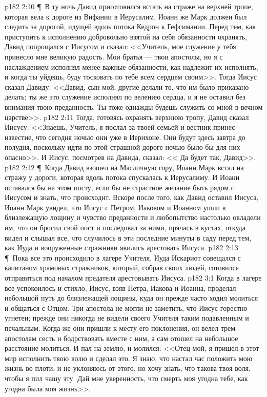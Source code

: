 \vs p182 2:10 \P\ В ту ночь Давид приготовился встать на страже на верхней тропе, которая вела к дороге из Вифании в Иерусалим, Иоанн же Марк должен был следить за дорогой, идущей вдоль потока Кедрон к Гефсимании. Перед тем, как приступить к исполнению добровольно взятой на себя обязанности охранять, Давид попрощался с Иисусом и сказал: <<Учитель, мое служение у тебя принесло мне великую радость. Мои братья --- твои апостолы, но я с наслаждением исполнял менее важные обязанности, как надлежит их исполнять, и когда ты уйдешь, буду тосковать по тебе всем сердцем своим>>. Тогда Иисус сказал Давиду: <<Давид, сын мой, другие делали то, что им было приказано делать; ты же это служение исполнял по велению сердца, и я не оставил без внимания твою преданность. Ты тоже однажды будешь служить со мной в вечном царстве>>.
\vs p182 2:11 Тогда, готовясь охранять верхнюю тропу, Давид сказал Иисусу: <<Знаешь, Учитель, я послал за твоей семьей и вестник принес известие, что сегодня ночью они уже в Иерихоне. Они будут здесь завтра до полудня, поскольку идти по этой страшной дороге ночью было бы для них опасно>>. И Иисус, посмотрев на Давида, сказал: << Да будет так, Давид>>.
\vs p182 2:12 \P\ Когда Давид взошел на Масличную гору, Иоанн Марк встал на стражу у дороги, которая вдоль потока спускалась к Иерусалиму. И Иоанн оставался бы на этом посту, если бы не страстное желание быть рядом с Иисусом и знать, что происходит. Вскоре после того, как Давид оставил Иисуса, Иоанн Марк увидел, что Иисус с Петром, Иаковом и Иоанном ушли в близлежащую лощину и чувство преданности и любопытство настолько овладели им, что он бросил свой пост и последовал за ними, прячась в кустах, откуда видел и слышал все, что случилось в эти последние минуты в саду перед тем, как Иуда и вооруженные стражники явились арестовать Иисуса.
\vs p182 2:13 \P\ Пока все это происходило в лагере Учителя, Иуда Искариот совещался с капитаном храмовых стражников, который, собрав своих людей, готовился отправиться под началом предателя арестовывать Иисуса.
\vs p182 3:1 Когда в лагере все успокоилось и стихло, Иисус, взяв Петра, Иакова и Иоанна, проделал небольшой путь до близлежащей лощины, куда он прежде часто ходил молиться и общаться с Отцом. Три апостола не могли не заметить, что Иисус горестно угнетен; прежде они никогда не видели своего Учителя таким подавленным и печальным. Когда же они пришли к месту его поклонения, он велел трем апостолам сесть и бодрствовать вместе с ним, а сам отошел на небольшое расстояние молиться. И пал на землю, и молился: <<Отец мой, я пришел в этот мир исполнить твою волю и сделал это. Я знаю, что настал час положить мою жизнь во плоти, и не уклоняюсь от этого, но хочу знать, что такова твоя воля, чтобы я пил чашу эту. Дай мне уверенность, что смерть моя угодна тебе, как угодна была моя жизнь>>.
